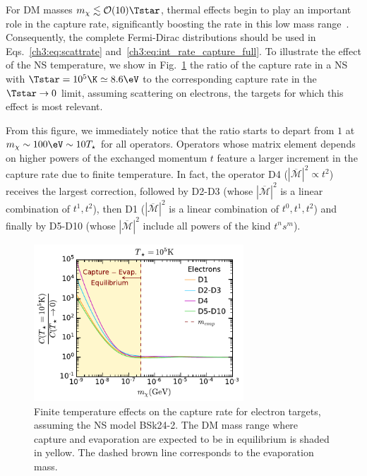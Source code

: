 For DM masses $m_\chi\lesssim \mathcal{O}(10)\Tstar$, thermal effects begin to play an important role in the capture rate, significantly boosting the rate in this low mass range~\cite{Garani:2018kkd_may_NewAnalysisNeutron}. Consequently, the complete Fermi-Dirac distributions should be used in Eqs.~\ref{ch3:eq:scattrate} and~\ref{ch3:eq:int_rate_capture_full}. To illustrate the effect of the NS temperature,  we show in Fig.~\ref{ch4:fig:CfiniteT_e} the ratio of the capture rate in a NS with 
$\Tstar=10^5\K\simeq8.6\eV$ to the corresponding capture rate in the $\Tstar\rightarrow0$ limit, assuming scattering on electrons, the targets for which this effect is most relevant. 

From this figure, we immediately notice that the ratio starts to depart from  $1$ at $m_\chi\sim100\eV\sim 10T_\star$ for all operators. Operators whose matrix element depends on higher powers of the exchanged momentum  $t$ feature a larger increment in the capture rate due to finite temperature. In fact, the operator D4 ($|\overline{\mathcal{M}}|^2\propto t^2$) receives the largest correction, followed by D2-D3 (whose $|\overline{\mathcal{M}}|^2$ is a linear combination of $t^1,t^2$), then D1 ($|\overline{\mathcal{M}}|^2$ is a linear combination of $t^0,t^1,t^2$) and finally by  D5-D10 (whose $|\overline{\mathcal{M}}|^2$ include all powers of the kind $t^n s^m$).

\begin{figure}[t!bp]
    \centering
    \includegraphics[width=0.7\textwidth]{capture_2/R_CT_mdm_10_5K_D1_D10_e.pdf}
    \caption{Finite temperature effects on the capture rate for electron targets, assuming the NS model BSk24-2. The DM mass range where capture and evaporation are expected to be in equilibrium is shaded in yellow. The dashed brown line corresponds to the evaporation mass.}
    \label{ch4:fig:CfiniteT_e}
\end{figure}


